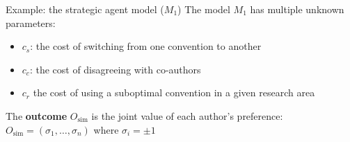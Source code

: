 \documentclass[10pt]{beamer}
\begin{document}
\begin{frame}{Example: the strategic agent model ($M_1$)}
    The model $M_1$ has multiple unknown parameters:
    \begin{itemize}
        \item $c_s$: the cost of switching from one convention to another
        \item $c_c$: the cost of disagreeing with co-authors
        \item $c_{r}$ the cost of using a suboptimal convention in a given research area
    \end{itemize}

    \vspace{0.5em}

    The \textbf{outcome} $O_{\text{sim}}$ is the joint value of each author's preference: $O_{\text{sim}}=(\sigma_1,\dots,\sigma_n)$ where $\sigma_i = \pm 1$

\end{frame}
\end{document}

